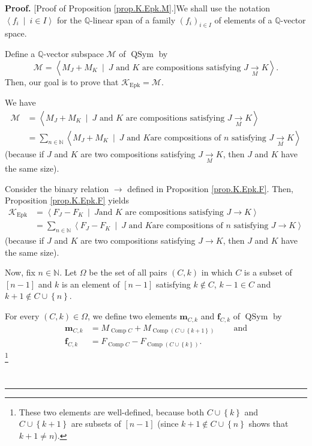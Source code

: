 \documentclass[numbers=enddot,12pt,final,onecolumn,notitlepage]{scrartcl}%
\theoremstyle{definition}
\newenvironment{proof}[1][Proof]{\noindent\textbf{#1.} }{\ \rule{0.5em}{0.5em}}
\newenvironment{verlong}{}{}
\let\sumnonlimits\sum
\renewcommand{\sum}{\sumnonlimits\limits}
\begin{document}
\begin{verlong}
\begin{proof}
[Proof of Proposition \ref{prop.K.Epk.M}.]We shall use the notation
$\left\langle f_{i}\ \mid\ i\in I\right\rangle $ for the $\mathbb{Q}$-linear
span of a family $\left(  f_{i}\right)  _{i\in I}$ of elements of a
$\mathbb{Q}$-vector space.

Define a $\mathbb{Q}$-vector subspace $\mathcal{M}$ of $\operatorname*{QSym}$
by%
\[
\mathcal{M}=\left\langle M_{J}+M_{K}\ \mid\ J\text{ and }K\text{ are
compositions satisfying }J\underset{M}{\rightarrow}K\right\rangle .
\]
Then, our goal is to prove that $\mathcal{K}_{\operatorname*{Epk}}%
=\mathcal{M}$.

We have%
\begin{align*}
\mathcal{M}  &  =\left\langle M_{J}+M_{K}\ \mid\ J\text{ and }K\text{ are
compositions satisfying }J\underset{M}{\rightarrow}K\right\rangle \\
&  =\sum_{n\in\mathbb{N}}\left\langle M_{J}+M_{K}\ \mid\ J\text{ and }K\text{
are compositions of }n\text{ satisfying }J\underset{M}{\rightarrow
}K\right\rangle
\end{align*}
(because if $J$ and $K$ are two compositions satisfying
$J\underset{M}{\rightarrow}K$, then $J$ and $K$ have the same size).

Consider the binary relation $\rightarrow$ defined in Proposition
\ref{prop.K.Epk.F}. Then, Proposition \ref{prop.K.Epk.F} yields%
\begin{align*}
\mathcal{K}_{\operatorname*{Epk}}  &  =\left\langle F_{J}-F_{K}\ \mid\ J\text{
and }K\text{ are compositions satisfying }J\rightarrow K\right\rangle \\
&  =\sum_{n\in\mathbb{N}}\left\langle F_{J}-F_{K}\ \mid\ J\text{ and }K\text{
are compositions of }n\text{ satisfying }J\rightarrow K\right\rangle
\end{align*}
(because if $J$ and $K$ are two compositions satisfying $J\rightarrow K$, then
$J$ and $K$ have the same size).

Now, fix $n\in\mathbb{N}$. Let $\Omega$ be the set of all pairs $\left(
C,k\right)  $ in which $C$ is a subset of $\left[  n-1\right]  $ and $k$ is an
element of $\left[  n-1\right]  $ satisfying $k\notin C$, $k-1\in C$ and
$k+1\notin C\cup\left\{  n\right\}  $.

For every $\left(  C,k\right)  \in\Omega$, we define two elements
$\mathbf{m}_{C,k}$ and $\mathbf{f}_{C,k}$ of $\operatorname*{QSym}$ by%
\begin{align}
\mathbf{m}_{C,k}  &  =M_{\operatorname*{Comp}C}+M_{\operatorname*{Comp}\left(
C\cup\left\{  k+1\right\}  \right)  }\ \ \ \ \ \ \ \ \ \ \text{and}%
\label{pf.prop.K.Epk.M.mCk=}\\
\mathbf{f}_{C,k}  &  =F_{\operatorname*{Comp}C}-F_{\operatorname*{Comp}\left(
C\cup\left\{  k\right\}  \right)  }. \label{pf.prop.K.Epk.M.fCk=}%
\end{align}
\footnote{These two elements are well-defined, because both $C\cup\left\{
k\right\}  $ and $C\cup\left\{  k+1\right\}  $ are subsets of $\left[
n-1\right]  $ (since $k+1\notin C\cup\left\{  n\right\}  $ shows that $k+1\neq
n$).}


\end{proof}
\end{verlong}
\end{document}
